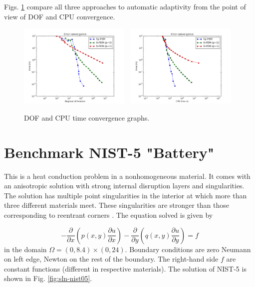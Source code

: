 \documentclass[12pt]{elsarticle}
\begin{document}
Figs. \ref{fig:nist-4-conv} compare all
three approaches to automatic adaptivity from the point
of view of DOF and CPU convergence.

\begin{figure}[!ht]
\centering
\includegraphics[height=4cm]{nist/nist-4/conv_dof_aniso.png}\ \
\includegraphics[height=4cm]{nist/nist-4/conv_cpu_aniso.png}
\caption{DOF and CPU time convergence graphs.}
\label{fig:nist-4-conv}
\end{figure}


\section{Benchmark NIST-5 "Battery"}
\label{sec:bench-5}

This is a heat conduction problem in a nonhomogeneous material.
It comes with an anisotropic solution with strong internal disruption
layers and singularities.
The solution has multiple point singularities in the interior at which
more than three different materials meet. These singularities are stronger than those
corresponding to reentrant corners \cite{demkowicz-1}.
The equation solved is given by

\begin{equation} \label{heat-conduction}
-\frac{\partial }{\partial x}\left(p(x, y)\frac{\partial u}{\partial x}\right)
-\frac{\partial }{\partial y}\left(q(x, y)\frac{\partial u}{\partial y}\right) = f
\end{equation}
in the domain $\Omega = (0, 8.4) \times (0, 24)$. Boundary conditions are zero Neumann on left edge, Newton on the rest of the boundary.
The right-hand side $f$ are constant functions (different in respective materials).
The solution of NIST-5 is shown in Fig. \ref{fig:sln-nist05}.
\end{document}

